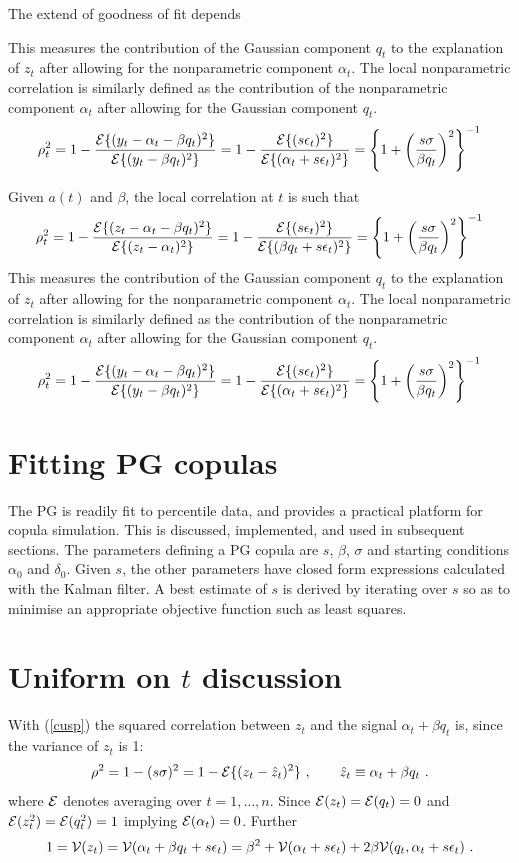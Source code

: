 \documentclass[authoryear]{elsarticle}
\newcommand{\eps}{\epsilon}
\newcommand{\Ex}{{\cal E}}
\newcommand{\eref}[1]{(\ref{#1})}
\newcommand{\cq}{\ , \qquad}
\newcommand{\Vx}{{\cal V}}
\begin{document}
   The extend of goodness of fit depends 


This measures the contribution of the Gaussian component $q_t$ to the explanation of $z_t$ after allowing for the nonparametric component $\alpha_t$.    The local nonparametric correlation is similarly defined as the contribution of the nonparametric component $\alpha_t$ after allowing for the Gaussian component $q_t$.
$$
\rho_t^2=1-\frac{\Ex\{(y_t-\alpha_t-\beta q_t)^2\}}{\Ex\{(y_t-\beta q_t)^2\}} =  1-\frac{\Ex\{(s\eps_t)^2\}}{\Ex\{(\alpha_t+s\eps_t)^2\}} = \left\{1+\left(\frac{s\sigma}{\beta q_t}\right)^2\right\}^{-1}
$$

Given $a(t)$ and $\beta$, the local  correlation at $t$ is such that
$$
\rho_t^2=1-\frac{\Ex\{(z_t-\alpha_t-\beta q_t)^2\}}{\Ex\{(z_t-\alpha_t)^2\}} =  1-\frac{\Ex\{(s\eps_t)^2\}}{\Ex\{(\beta q_t+s\eps_t)^2\}} = \left\{1+\left(\frac{s\sigma}{\beta q_t}\right)^2\right\}^{-1}
$$
This measures the contribution of the Gaussian component $q_t$ to the explanation of $z_t$ after allowing for the nonparametric component $\alpha_t$.    The local nonparametric correlation is similarly defined as the contribution of the nonparametric component $\alpha_t$ after allowing for the Gaussian component $q_t$.
$$
\rho_t^2=1-\frac{\Ex\{(y_t-\alpha_t-\beta q_t)^2\}}{\Ex\{(y_t-\beta q_t)^2\}} =  1-\frac{\Ex\{(s\eps_t)^2\}}{\Ex\{(\alpha_t+s\eps_t)^2\}} = \left\{1+\left(\frac{s\sigma}{\beta q_t}\right)^2\right\}^{-1}
$$


\section{Fitting PG copulas}
 The PG is readily  fit to percentile data, and provides a practical platform for copula simulation.  This is discussed, implemented, and used in subsequent sections.  The  parameters defining a PG copula are $s$, $\beta$,  $\sigma$ and starting conditions $\alpha_0$ and $\delta_0$.  Given $s$, the other parameters have  closed form expressions calculated with the Kalman filter.  A best estimate of $s$ is derived by iterating over $s$ so as to minimise  an appropriate objective function such as least squares. 

\section{Uniform on $t$ discussion}

With \eref{cusp} the squared correlation between $z_t$ and the signal $\alpha_t+\beta q_t$ is, since the variance of $z_t$ is 1:
 $$
 \rho^2=1-(s\sigma)^2 = 1- \Ex\{(z_t-\hat z_t)^2\}\cq \hat z_t\equiv\alpha_t+\beta q_t\ .
 $$
 where $\Ex$ denotes averaging over $t=1,\ldots,n$.  Since $\Ex(z_t)=\Ex(q_t)=0$ and $\Ex(z_t^2)=\Ex(q_t^2)=1$ implying
 $\Ex(\alpha_t)=0$.  Further
 $$
 1=\Vx(z_t) = \Vx(\alpha_t+\beta q_t + s\eps_t) = \beta^2 + \Vx(\alpha_t+s\eps_t) + 2\beta\Vx(q_t,\alpha_t+s\eps_t)\ .
 $$
 
\end{document}

